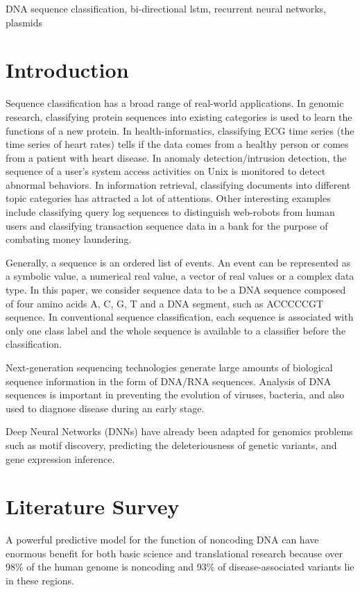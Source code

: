 \documentclass[conference]{IEEEtran}
\begin{document}
\begin{IEEEkeywords}
DNA sequence classification, bi-directional lstm, recurrent neural networks, plasmids
\end{IEEEkeywords}

\section{Introduction}
Sequence classification has a broad range of real-world applications. In genomic research, classifying protein sequences into existing categories is used to learn the functions of a new protein. In health-informatics, classifying ECG time series (the time series of heart rates) tells if the data comes from a healthy person or comes from a patient with heart disease. In anomaly detection/intrusion detection, the sequence of a user’s system access activities on Unix is monitored to detect abnormal behaviors. In information retrieval, classifying documents into different topic categories has attracted a lot of attentions. Other interesting examples include classifying query log sequences to distinguish web-robots from human users and classifying transaction sequence data in a bank for the purpose of combating money laundering.
\newline

Generally, a sequence is an ordered list of events. An event
can be represented as a symbolic value, a numerical real value, a vector of real values or a complex data type. In this paper, we consider sequence data to be a DNA sequence composed of four amino acids A, C, G, T and a DNA segment, such as ACCCCCGT sequence. In conventional sequence classification, each sequence is associated with only one class label and the whole sequence
is available to a classifier before the classification.
\newline

Next-generation sequencing technologies generate large amounts of biological sequence information in the form of DNA/RNA sequences. Analysis of DNA sequences is important in preventing the evolution of viruses, bacteria, and also used to diagnose disease during an early stage.

Deep Neural Networks (DNNs) have already been adapted for genomics problems such as motif discovery, predicting the deleteriousness of genetic variants, and gene expression inference.

\section{Literature Survey}
A powerful predictive model for the function of noncoding DNA can have enormous benefit for both basic science and translational research because over 98\% of the human genome is noncoding and 93\% of disease-associated variants lie in these regions.
\newline
\end{document}
